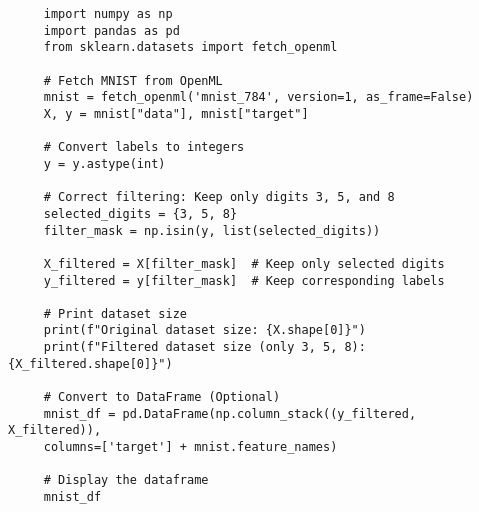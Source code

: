 \documentclass[letterpaper]{article}
\begin{document}
		\begin{lstlisting}
     import numpy as np
     import pandas as pd
     from sklearn.datasets import fetch_openml
     
     # Fetch MNIST from OpenML
     mnist = fetch_openml('mnist_784', version=1, as_frame=False)
     X, y = mnist["data"], mnist["target"]
     
     # Convert labels to integers
     y = y.astype(int)
     
     # Correct filtering: Keep only digits 3, 5, and 8
     selected_digits = {3, 5, 8}
     filter_mask = np.isin(y, list(selected_digits))
     
     X_filtered = X[filter_mask]  # Keep only selected digits
     y_filtered = y[filter_mask]  # Keep corresponding labels
     
     # Print dataset size
     print(f"Original dataset size: {X.shape[0]}")
     print(f"Filtered dataset size (only 3, 5, 8): {X_filtered.shape[0]}")
     
     # Convert to DataFrame (Optional)
     mnist_df = pd.DataFrame(np.column_stack((y_filtered, X_filtered)), 
     columns=['target'] + mnist.feature_names)
     
     # Display the dataframe
     mnist_df
		\end{lstlisting}
	
\end{document}
